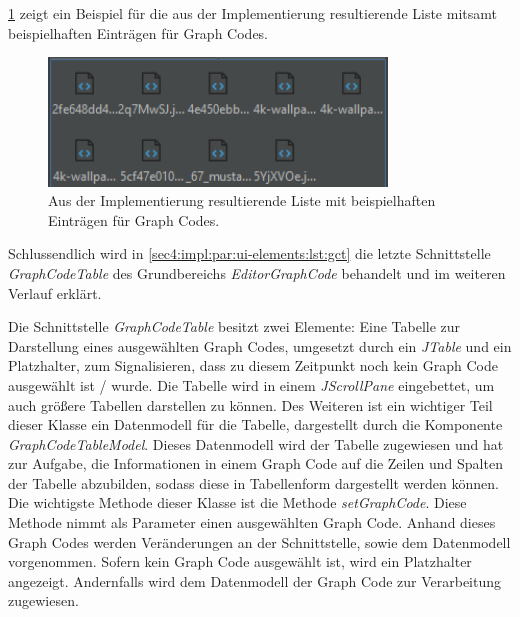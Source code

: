 

\cref{sec4:impl:par:ui-elements:fig:wireframe-ui-5} zeigt ein Beispiel für die aus der Implementierung resultierende Liste mitsamt beispielhaften Einträgen für Graph Codes.

\begin{figure}[!ht]
  \includegraphics[width=9cm]{chapter/chapter_4/wireframe-impl-ui-5}
  \caption{Aus der Implementierung resultierende Liste mit beispielhaften Einträgen für Graph Codes.}
  \label{sec4:impl:par:ui-elements:fig:wireframe-ui-5}
\end{figure}

Schlussendlich wird in \cref{sec4:impl:par:ui-elements:lst:gct} die letzte Schnittstelle  \textit{GraphCodeTable} des Grundbereichs \textit{EditorGraphCode} behandelt und im weiteren Verlauf erklärt.



Die Schnittstelle \textit{GraphCodeTable} besitzt zwei Elemente: Eine Tabelle zur Darstellung eines ausgewählten Graph Codes, umgesetzt durch ein \textit{JTable} und ein Platzhalter, zum Signalisieren, dass zu diesem Zeitpunkt noch kein Graph Code ausgewählt ist / wurde.
Die Tabelle wird in einem \textit{JScrollPane} eingebettet, um auch größere Tabellen darstellen zu können.
Des Weiteren ist ein wichtiger Teil dieser Klasse ein Datenmodell für die Tabelle, dargestellt durch die Komponente \textit{GraphCodeTableModel}.
Dieses Datenmodell wird der Tabelle zugewiesen und hat zur Aufgabe, die Informationen in einem Graph Code auf die Zeilen und Spalten der Tabelle abzubilden, sodass diese in Tabellenform dargestellt werden können.
Die wichtigste Methode dieser Klasse ist die Methode \textit{setGraphCode}.
Diese Methode nimmt als Parameter einen ausgewählten Graph Code.
Anhand dieses Graph Codes werden Veränderungen an der Schnittstelle, sowie dem Datenmodell vorgenommen.
Sofern kein Graph Code ausgewählt ist, wird ein Platzhalter angezeigt.
Andernfalls wird dem Datenmodell der Graph Code zur Verarbeitung zugewiesen.

